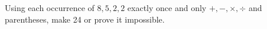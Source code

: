 Using each occurrence of $8,5,2,2$ exactly once and only $+,-,\times,\div$ and parentheses, make 24 or prove it impossible.
